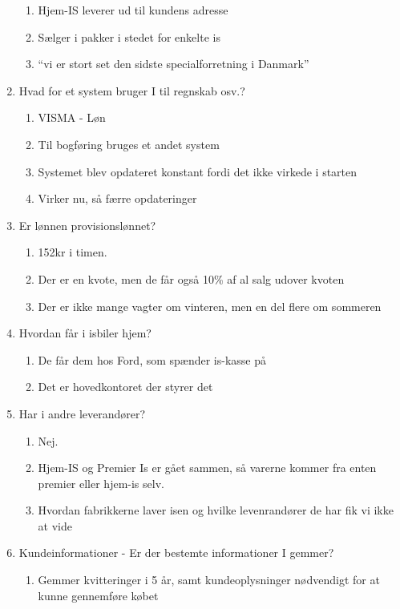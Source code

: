 \begin{enumerate}
\begin{enumerate}
        \item Hjem-IS leverer ud til kundens adresse
        \item Sælger i pakker i stedet for enkelte is
        \item “vi er stort set den sidste specialforretning i Danmark”
    \end{enumerate}
    \item Hvad for et system bruger I til regnskab osv.?
    \begin{enumerate}
        \item VISMA - Løn 
        \item Til bogføring bruges et andet system
        \item Systemet blev opdateret konstant fordi det ikke virkede i starten
        \item Virker nu, så færre opdateringer
    \end{enumerate}
    \item Er lønnen provisionslønnet?
    \begin{enumerate}
        \item 152kr i timen.
        \item Der er en kvote, men de får også 10\% af al salg udover kvoten
        \item Der er ikke mange vagter om vinteren, men en del flere om sommeren
    \end{enumerate}
    \item Hvordan får i isbiler hjem?
    \begin{enumerate}
        \item De får dem hos Ford, som spænder is-kasse på
        \item Det er hovedkontoret der styrer det
    \end{enumerate}
    \item Har i andre leverandører?
    \begin{enumerate}
        \item Nej.
        \item Hjem-IS og Premier Is er gået sammen, så varerne kommer fra enten premier eller hjem-is selv.
        \item Hvordan fabrikkerne laver isen og hvilke levenrandører de har fik vi ikke at vide
    \end{enumerate}
    \item Kundeinformationer - Er der bestemte informationer I gemmer?
    \begin{enumerate}
        \item Gemmer kvitteringer i 5 år, samt kundeoplysninger nødvendigt for at kunne gennemføre købet

\end{enumerate}
\end{enumerate}
